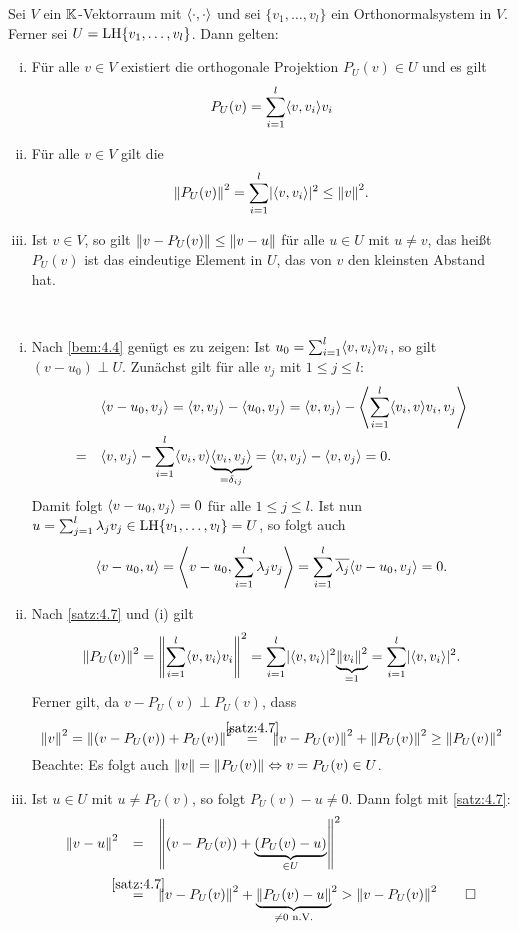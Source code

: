 \begin{satz}
	\label{satz:4.9}
	Sei $V$ ein $\mathbb{K}$-Vektorraum mit $\left\langle\cdot,\cdot\right\rangle$ und sei $\{v_1,\dots,v_l\}$ ein Orthonormalsystem in $V$.
	Ferner sei $U = \operatorname{LH}\{v_1,\dots,v_l\}$.
	Dann gelten:
	\begin{enumerate}[(i)]
		\item Für alle $v \in V$ existiert die orthogonale Projektion $P_U(v) \in U$ und es gilt
		\[
			P_U(v) = \sum_{i=1}^{l} \sk{v,v_i} v_i
		\]
		\item Für alle $v \in V$ gilt die 
		\[
			\no{P_U(v)}^2 = \sum_{i=1}^{l} \abs{\sk{v,v_i}}^2 \leq \no{v}^2.
		\]
		\item Ist $v \in V$, so gilt $\left\lVert v- P_U(v)\right\rVert \leq \left\lVert v-u\right\rVert$ für alle $u \in U$ mit $u \neq v$, das heißt $P_U(v)$ ist das eindeutige Element in $U$, das von $v$ den kleinsten Abstand hat.
	\end{enumerate}
\end{satz}
\newpage
\begin{beweis}
	\mbox{} \\[-.9cm]
	\begin{enumerate}[(i)]
		\item Nach \autoref{bem:4.4} genügt es zu zeigen:
		Ist $u_0 = \sum_{i=1}^{l} \sk{v,v_i} v_i$, so gilt $(v-u_0) \perp U$.
		Zunächst gilt für alle $v_j$ mit $1 \leq j \leq l$:
		\begin{align*}
			&\sk{v-u_0,v_j} = \sk{v,v_j} - \sk{u_0,v_j} = \sk{v,v_j} - \sk{\sum_{i=1}^{l} \sk{v_i,v}v_i,v_j} \\
			=\quad &\sk{v,v_j} - \sum_{i=1}^{l} \sk{v_i,v} \Underbrace{\sk{v_i,v_j}}{=\delta_{ij}} = \sk{v,v_j} - \sk{v,v_j} = 0.
		\end{align*}
		Damit folgt $\left\langle v-u_0,v_j\right\rangle = 0$ für alle $1 \leq j \leq l$.
		Ist nun $u = \sum_{j=1}^{l} \lambda_j v_j \in \operatorname{LH}\{v_1,\dots,v_l\} = U$, so folgt auch
		\[
			\sk{v-u_0,u} = \sk{v-u_0,\sum_{i=1}^{l} \lambda_j v_j} = \sum_{i=1}^{l} \ol{\lambda_j} \sk{v-u_0,v_j} = 0.
		\]
		\item Nach \autoref{satz:4.7} und (i) gilt
		\[
			\no{P_U(v)}^2 = \no{\sum_{i=1}^{l} \sk{v,v_i} v_i}^2 = \sum_{i=1}^{l} \abs{\sk{v,v_i}}^2 \Underbrace{\no{v_i}^2}{=1} = \sum_{i=1}^{l} \abs{\sk{v,v_i}}^2.
		\]
		Ferner gilt, da $v - P_U(v) \perp P_U(v)$, dass
		\[
			\no{v}^2 = \no{(v-P_U(v)) + P_U(v)}^2 \stack{\ref{satz:4.7}}{=} \no{v - P_U(v)}^2 + \no{P_U(v)}^2 \geq \no{P_U(v)}^2
		\]
		Beachte: Es folgt auch $\left\lVert v\right\rVert = \left\lVert P_U(v)\right\rVert \Leftrightarrow v = P_U(v) \in U$.
		\item Ist $u \in U$ mit $u \neq P_U(v)$, so folgt $P_U(v) - u \neq 0$.
		Dann folgt mit \autoref{satz:4.7}:
		\begin{align*}
			\no{v-u}^2 &\stack{}{=} \no{(v-P_U(v)) + \Underbrace{(P_U(v) - u)}{\in U}}^2 \\
			&\stack{\ref{satz:4.7}}{=} \no{v-P_U(v)}^2 + \Underbrace{\no{P_U(v)-u}}{\neq 0 \text{ n.V.}}^2 > \no{v-P_U(v)}^2 \qedhere
		\end{align*}
	\end{enumerate}
\end{beweis}

